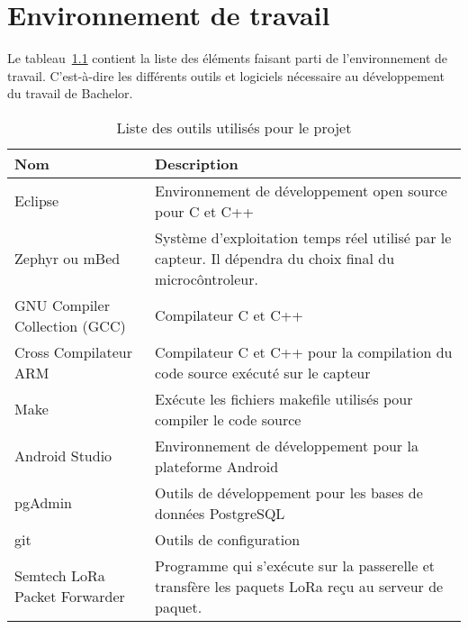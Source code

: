 \chapter{Environnement de travail}

Le tableau~\ref{tab:env_travail} contient la liste des éléments faisant parti de l’environnement de travail. C’est-à-dire les différents outils et logiciels nécessaire au développement du travail de Bachelor.

\begin{table}[htb]
\caption[Liste des outils utilisés pour le projet]{Liste des outils utilisés pour le projet}
\label{tab:env_travail}
\centering
\begin{tabular}{lp{8cm}}
\toprule
Nom & Description \\
\midrule
Eclipse &	Environnement de développement open source pour C et C++\\
Zephyr ou mBed & Système d’exploitation temps réel utilisé par le capteur. Il dépendra du choix final du microcôntroleur.\\
GNU Compiler Collection (GCC) & Compilateur C et C++\\
Cross Compilateur ARM & Compilateur C et C++ pour la compilation du code source exécuté sur le capteur\\
Make & Exécute les fichiers makefile utilisés pour compiler le code source\\
Android Studio & Environnement de développement pour la plateforme Android\\
pgAdmin & Outils de développement pour les bases de données PostgreSQL\\
git	 & Outils de configuration\\
Semtech LoRa Packet Forwarder & Programme qui s’exécute sur la passerelle et transfère les paquets LoRa reçu au serveur de paquet. \\
\bottomrule 
\end{tabular}
\end{table}